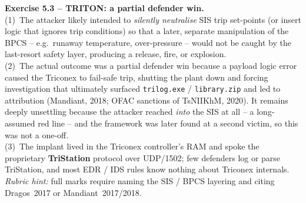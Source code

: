 \documentclass[11pt,a4paper]{article}
\begin{document}
\begin{solutionbox}
\textbf{Exercise 5.3 -- TRITON: a partial defender win.}\\
(1)~The attacker likely intended to \emph{silently neutralise} SIS trip set-points (or insert
logic that ignores trip conditions) so that a later, separate manipulation of the BPCS -- e.g.\
runaway temperature, over-pressure -- would not be caught by the last-resort safety layer,
producing a release, fire, or explosion.\\
(2)~The actual outcome was a partial defender win because a payload logic error caused the
Triconex to fail-safe trip, shutting the plant down and forcing investigation that
ultimately surfaced \texttt{trilog.exe} / \texttt{library.zip} and led to attribution
(Mandiant, 2018; OFAC sanctions of TsNIIKhM, 2020). It remains deeply unsettling because the
attacker reached \emph{into} the SIS at all -- a long-assumed red line -- and the framework was
later found at a second victim, so this was not a one-off.\\
(3)~The implant lived in the Triconex controller's RAM and spoke the proprietary
\textbf{TriStation} protocol over UDP/1502; few defenders log or parse TriStation, and most
EDR / IDS rules know nothing about Triconex internals.\\[2pt]
\emph{Rubric hint:} full marks require naming the SIS / BPCS layering and citing
Dragos~2017 or Mandiant~2017/2018.
\end{solutionbox}
\end{document}
